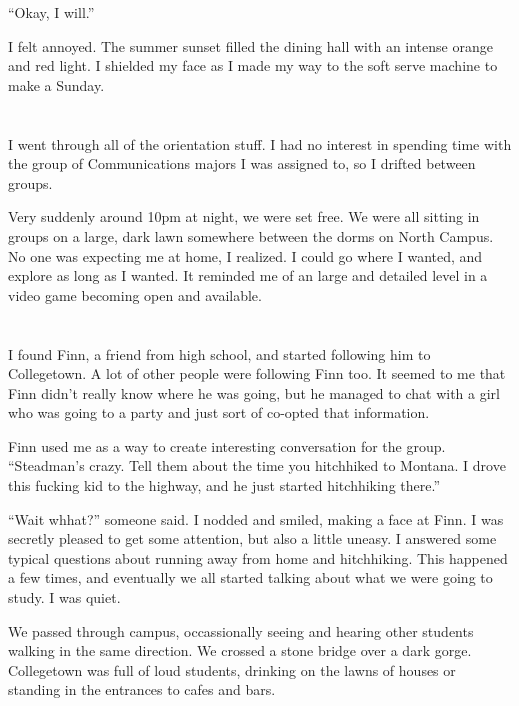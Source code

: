 ``Okay, I will.''

I felt annoyed.  The summer sunset filled the dining hall with an intense orange
and red light.  I shielded my face as I made my way to the soft serve machine to
make a Sunday.

\section{}

I went through all of the orientation stuff.  I had no interest in spending
time with the group of Communications majors I was assigned to, so I drifted
between groups. 

Very suddenly around 10pm at night, we were set free.  We were all sitting in
groups on a large, dark lawn somewhere between the dorms on North Campus.  No
one was expecting me at home, I realized.  I could go where I wanted, and
explore as long as I wanted.  It reminded me of an large and detailed level in a
video game becoming open and available.

\section{}

I found Finn, a friend from high school, and started following him to
Collegetown.  A lot of other people were following Finn too.  It seemed to me
that Finn didn't really know where he was going, but he managed to chat with a
girl who was going to a party and just sort of co-opted that information.  

Finn used me as a way to create interesting conversation for the group.
``Steadman's crazy.  Tell them about the time you hitchhiked to Montana.  I
drove this fucking kid to the highway, and he just started hitchhiking there.''

``Wait whhat?'' someone said.  I nodded and smiled, making a face at Finn.  I
was secretly pleased to get some attention, but also a little uneasy.  I
answered some typical questions about running away from home and hitchhiking.
This happened a few times, and eventually we all started talking about what we
were going to study.  I was quiet. 

We passed through campus, occassionally seeing and hearing other students
walking in the same direction.  We crossed a stone bridge over a dark gorge.
Collegetown was full of loud students, drinking on the lawns of houses or
standing in the entrances to cafes and bars.


